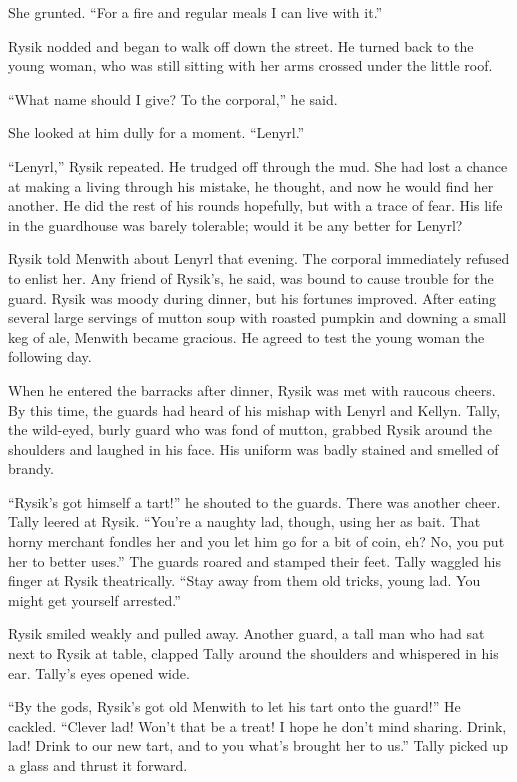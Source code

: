 \documentclass[10pt,a4paper]{article}
\begin{document}
She grunted. ``For a fire and regular meals I can live with it.''

Rysik nodded and began to walk off down the street. He turned back
to the young woman, who was still sitting with her arms crossed
under the little roof.

``What name should I give? To the corporal,'' he said.

She looked at him dully for a moment. ``Lenyrl.''

``Lenyrl,'' Rysik repeated. He trudged off through the mud. She had
lost a chance at making a living through his mistake, he thought,
and now he would find her another. He did the rest of his rounds
hopefully, but with a trace of fear. His life in the guardhouse
was barely tolerable; would it be any better for Lenyrl?

\bigskip

Rysik told Menwith about Lenyrl that evening. The corporal
immediately refused to enlist her. Any friend of Rysik's, he said,
was bound to cause trouble for the guard. Rysik was moody during
dinner, but his fortunes improved. After eating several large
servings of mutton soup with roasted pumpkin and downing a small
keg of ale, Menwith became gracious. He agreed to test the young
woman the following day.

When he entered the barracks after dinner, Rysik was met with
raucous cheers. By this time, the guards had heard of his mishap
with Lenyrl and Kellyn. Tally, the wild-eyed, burly guard who was
fond of mutton, grabbed Rysik around the shoulders and laughed in
his face. His uniform was badly stained and smelled of brandy.

``Rysik's got himself a tart!'' he shouted to the guards. There
was another cheer. Tally leered at Rysik. ``You're a naughty lad,
though, using her as bait. That horny merchant fondles her and you
let him go for a bit of coin, eh? No, you put her to better uses.''
The guards roared and stamped their feet. Tally waggled his finger at
Rysik theatrically. ``Stay away from them old tricks, young lad. You
might get yourself arrested.''

Rysik smiled weakly and pulled away. Another guard, a tall man who
had sat next to Rysik at table, clapped Tally around the shoulders
and whispered in his ear. Tally's eyes opened wide.

``By the gods, Rysik's got old Menwith to let his tart onto the
guard!'' He cackled. ``Clever lad! Won't that be a treat! I hope
he don't mind sharing. Drink, lad! Drink to our new tart, and to
you what's brought her to us.'' Tally picked up a glass and thrust
it forward.
\end{document}
